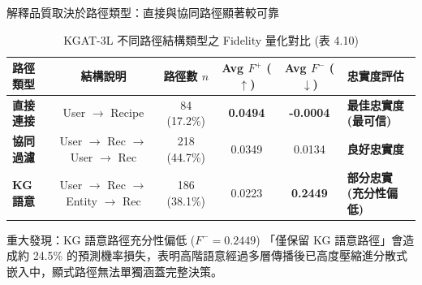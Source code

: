\documentclass[aspectratio=169, 10pt]{beamer}
\begin{document}
\begin{frame}{解釋品質取決於路徑類型：直接與協同路徑顯著較可靠}
  \begin{table}
    \centering
    \caption{KGAT-3L 不同路徑結構類型之 Fidelity 量化對比 (表 4.10)}
    \begin{tabular}{l c c c c l}
      \toprule
      \textbf{路徑類型} & \textbf{結構說明} & \textbf{路徑數 $n$} & \textbf{Avg $F^+$ ($\uparrow$)} & \textbf{Avg $F^-$ ($\downarrow$)} & \textbf{忠實度評估} \\
      \midrule
      \textbf{直接連接} & User $\to$ Recipe & 84 (17.2\%) & \textbf{0.0494} & \textbf{-0.0004} & \textcolor{NTUBlue}{\textbf{最佳忠實度 (最可信)}} \\
      \textbf{協同過濾} & User $\to$ Rec $\to$ User $\to$ Rec & 218 (44.7\%) & 0.0349 & 0.0134 & \textcolor{NTUBlueAccent}{\textbf{良好忠實度}} \\
      \textbf{KG 語意} & User $\to$ Rec $\to$ Entity $\to$ Rec & 186 (38.1\%) & 0.0223 & \textbf{0.2449} & \textcolor{HighlightRed}{\textbf{部分忠實 (充分性偏低)}} \\
      \bottomrule
    \end{tabular}
  \end{table}
  
  \begin{alertblock}{重大發現：KG 語意路徑充分性偏低 ($F^- = 0.2449$)}
    「僅保留 KG 語意路徑」會造成約 24.5\% 的預測機率損失，表明高階語意經過多層傳播後已高度壓縮進分散式嵌入中，顯式路徑無法單獨涵蓋完整決策。
  \end{alertblock}
\end{frame}
\end{document}
